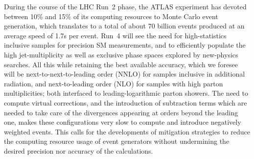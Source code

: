 During the course of the LHC Run~2 phase, the ATLAS experiment has devoted between 10\% and 15\% of its computing resources to Monte Carlo event generation, which translates to a total of about 70 billion events produced at an average speed of 1.7s per event.
Run~4 will see the need for high-statistics inclusive samples for precision SM measurements, and to efficiently populate the high jet-multiplicity as well as exclusive phase spaces explored by new-physics searches. 
All this while retaining the best available accuracy,
which we foresee will be next-to-next-to-leading order (NNLO) for samples inclusive in additional radiation, 
and next-to-leading order (NLO) for samples with high parton multiplicities; 
both interfaced to leading-logarithmic parton showers.
The need to compute virtual corrections, and the introduction of subtraction terms which are needed to 
take care of the divergences appearing at orders beyond the leading one, makes these configurations very slow to compute and introduce negatively weighted events.
This calls for the developments of mitigation strategies to reduce the  computing resource usage of event generators without undermining the desired precision nor accuracy of the calculations. 




